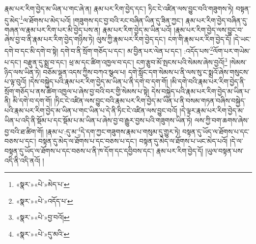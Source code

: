 རྣམ་པར་རིག་བྱེད་མ་ཡིན་པ་གང་ཞེ་ན། རྣམ་པར་རིག་བྱེད་དང་། ཏིང་ངེ་འཛིན་ལས་བྱུང་བའི་གཟུགས་ཏེ། བསྟན་དུ་མེད་\footnote{«སྣར་»«པེ་»མེད་པ་}ལ་ཐོགས་པ་མེད་པའོ། །གཟུགས་དང་བྱ་བའི་རང་བཞིན་ཡིན་དུ་ཟིན་ཀྱང་། རྣམ་པར་རིག་བྱེད་བཞིན་དུ་གཞན་ལ་རྣམ་པར་རིག་པར་མི་བྱེད་པས་ན། རྣམ་པར་རིག་བྱེད་མ་ཡིན་པའོ། །རྣམ་པར་རིག་བྱེད་ལས་བྱུང་བ་ཞེས་བྱ་བ་ནི་རྣམ་པར་རིག་བྱེད་གཉིས་ཏེ། ལུས་ཀྱི་རྣམ་པར་རིག་བྱེད་དང་། ངག་གི་རྣམ་པར་རིག་བྱེད་དོ། །དེ་ཡང་དགེ་བ་དང་མི་དགེ་བ་སྟེ། དགེ་བ་ནི་སྲོག་གཅོད་པ་དང་། མ་བྱིན་པར་ལེན་པ་དང་། :འདོད་པས་\footnote{«སྣར་»«པེ་»འདོད་པ་}ལོག་པར་གཡེམ་པ་དང་། བརྫུན་དུ་སྨྲ་བ་དང་། ཕྲ་མ་དང་ཚིག་འཁྱལ་བ་དང་། ངག་རྩུབ་མོ་སྤངས་པའི་སེམས་ཞེས་བྱའོ།\footnote{«སྣར་»«པེ་»བྱ་བའོ།} །སེམས་ཉིད་ལས་ཡིན་ཏེ། བཅོམ་ལྡན་འདས་ཀྱིས་བཀའ་སྩལ་པ། དགེ་སློང་དག་སེམས་པ་ནི་ལས་སུ་ང་སྨྲའོ་ཞེས་གསུངས་པ་ལྟ་བུའོ། །དེས་བསྐྱེད་པའི་རྣམ་པར་རིག་བྱེད་མ་ཡིན་པ་ནི་དགེ་བ་དག་གོ། །མི་དགེ་བའི་རྣམ་པར་རིག་བྱེད་ནི་སྲོག་གཅོད་པ་ནས་ཚིག་འཁྱལ་པ་ཞེས་བྱ་བའི་བར་གྱི་སེམས་པ་སྟེ། དེས་བསྐྱེད་པའི་རྣམ་པར་རིག་བྱེད་མ་ཡིན་པ་ནི། མི་དགེ་བ་དག་གོ། །ཏིང་ངེ་འཛིན་ལས་བྱུང་བའི་རྣམ་པར་རིག་བྱེད་མ་ཡིན་པ་ནི་བསམ་གཏན་བཞིས་བསྐྱེད་པའི་རྣམ་པར་རིག་བྱེད་མ་ཡིན་པ་གང་ཡིན་པ་དེ་ནི་ཏིང་ངེ་འཛིན་ལས་བྱུང་བའོ། །དེ་ལྟར་རྣམ་པར་རིག་བྱེད་མ་ཡིན་པ་འདི་ནི་སྡོམ་པ་དང་སྡོམ་པ་མ་ཡིན་པ་ཞེས་བྱ་བ་རྒྱུར་བྱས་པའི་གཟུགས་ཡིན་ཏེ། ལས་ཀྱི་བག་ཆགས་ཞེས་བྱ་བའི་ཐ་ཚིག་གོ། །རྣམ་པ་:དུ་མ་\footnote{«སྣར་»«པེ་»དུ་མའི་}དེ་དག་ཀྱང་གཟུགས་རྣམ་པ་གསུམ་དུ་གྱུར་ཏེ། བསྟན་དུ་ཡོད་ལ་ཐོགས་པ་དང་བཅས་པ་དང་། བསྟན་དུ་མེད་ལ་ཐོགས་པ་དང་བཅས་པ་དང་། བསྟན་དུ་མེད་ལ་ཐོགས་པ་ཡང་མེད་པའོ། །དེ་ལ་བསྟན་དུ་ཡོད་ལ་ཐོགས་པ་དང་བཅས་པ་ནི་ཁ་དོག་དང་དབྱིབས་དང་། རྣམ་པར་རིག་བྱེད་དོ། །ཡུལ་བསྟན་པས་འདི་ནི་འདི་ནའོ། །
